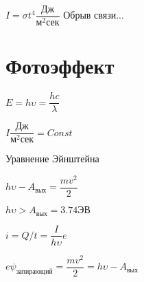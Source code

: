 \documentclass[15pt]{extarticle}
\begin{document}
$I = \sigma t^4 \dfrac{\text{Дж}}{\text{м}^2 \text{сек}}$
Обрыв связи...


\section{Фотоэффект}

$E = h\upsilon = \dfrac{hc}{\lambda}$

$I \dfrac{\text{Дж}}{\text{м}^2 \text{сек}} = Const$

Уравнение Эйнштейна

$h\upsilon - A_{\text{вых}} = \dfrac{mv^2}{2}$

$h\upsilon > A_{\text{вых}} = 3.74 \text{ЭВ}$

$i = Q / t = \dfrac{I} { h \upsilon} e$

$e \psi_{\text{запирающий}} =  \dfrac{mv^2}{2} = h\upsilon - A_{\text{вых}}$
\end{document}
